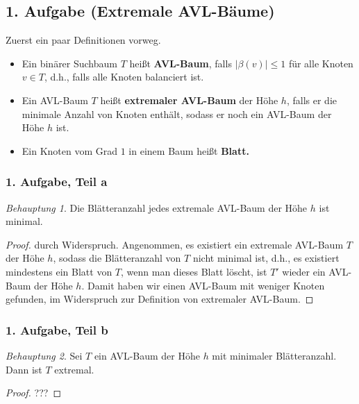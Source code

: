 \documentclass[draft,a5paper]{article}
\theoremstyle{remark}
\newtheorem*{beh}{Behauptung}
\newcommand{\envert}[1]{\left\lvert#1\right\rvert}
\let\abs=\envert
\begin{document}
\subsection*{1. Aufgabe (Extremale AVL-Bäume)}
Zuerst ein paar Definitionen vorweg.

\begin{itemize}
\item Ein binärer Suchbaum \(T\) heißt
  \textbf{AVL-Baum}, falls \(\abs{\beta(v)} \le 1\) für alle Knoten
  \(v \in T\), d.h., falls alle Knoten balanciert ist.

\item Ein AVL-Baum \(T\) heißt
  \textbf{extremaler AVL-Baum} der Höhe \(h\), falls er die minimale
  Anzahl von Knoten enthält, sodass er noch ein AVL-Baum der Höhe
  \(h\) ist.

\item Ein Knoten vom Grad \(1\) in einem Baum heißt
  \textbf{Blatt.}
\end{itemize}

\subsubsection*{1. Aufgabe, Teil a}
\begin{beh}
  Die Blätteranzahl jedes extremale AVL-Baum der Höhe \(h\) ist
  minimal.
\end{beh}

\begin{proof}
  durch Widerspruch.  Angenommen, es existiert ein extremale AVL-Baum
  \(T\) der Höhe \(h\), sodass die Blätteranzahl von \(T\) nicht
  minimal ist, d.h., es existiert mindestens ein Blatt von \(T\), wenn
  man dieses Blatt löscht, ist \(T'\) wieder ein AVL-Baum der Höhe
  \(h\).  Damit haben wir einen AVL-Baum mit weniger Knoten gefunden,
  im Widerspruch zur Definition von extremaler AVL-Baum.
\end{proof}

\subsubsection*{1. Aufgabe, Teil b}

\begin{beh}
  Sei \(T\) ein AVL-Baum der Höhe \(h\) mit minimaler Blätteranzahl.
  Dann ist \(T\) extremal.
\end{beh}

\begin{proof}
  ???
\end{proof}
\end{document}
